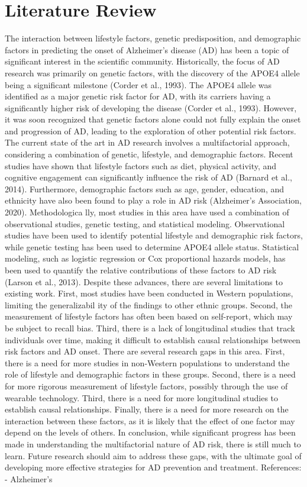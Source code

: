 \documentclass[conference]{IEEEtran}
\begin{document}
\section{Literature Review}
The interaction between lifestyle factors, genetic predisposition, and demographic factors in predicting the onset of Alzheimer's disease (AD) has been a topic of significant interest in the scientific community. Historically, the focus of AD research was primarily on genetic factors, with the discovery of the APOE4 allele being a significant milestone (Corder et al., 1993). The APOE4 allele was identified as a major genetic risk factor for AD, with its carriers having a significantly higher risk of developing the disease (Corder et al., 1993). However, it was soon recognized that genetic factors alone could not fully explain the onset and progression of AD, leading to the exploration of other potential risk factors. The current state of the art in AD research involves a multifactorial approach, considering a combination of genetic, lifestyle, and demographic factors. Recent studies have shown that lifestyle factors such as diet, physical activity, and cognitive engagement can significantly influence the risk of AD (Barnard et al., 2014). Furthermore, demographic factors such as age, gender, education, and ethnicity have also been found to play a role in AD risk (Alzheimer's Association, 2020). Methodologica lly, most studies in this area have used a combination of observational studies, genetic testing, and statistical modeling. Observational studies have been used to identify potential lifestyle and demographic risk factors, while genetic testing has been used to determine APOE4 allele status. Statistical modeling, such as logistic regression or Cox proportional hazards models, has been used to quantify the relative contributions of these factors to AD risk (Larson et al., 2013). Despite these advances, there are several limitations to existing work. First, most studies have been conducted in Western populations, limiting the generalizabil ity of the findings to other ethnic groups. Second, the measurement of lifestyle factors has often been based on self-report, which may be subject to recall bias. Third, there is a lack of longitudinal studies that track individuals over time, making it difficult to establish causal relationships between risk factors and AD onset. There are several research gaps in this area. First, there is a need for more studies in non-Western populations to understand the role of lifestyle and demographic factors in these groups. Second, there is a need for more rigorous measurement of lifestyle factors, possibly through the use of wearable technology. Third, there is a need for more longitudinal studies to establish causal relationships. Finally, there is a need for more research on the interaction between these factors, as it is likely that the effect of one factor may depend on the levels of others. In conclusion, while significant progress has been made in understanding the multifactorial nature of AD risk, there is still much to learn. Future research should aim to address these gaps, with the ultimate goal of developing more effective strategies for AD prevention and treatment. References: - Alzheimer's 
\end{document}
